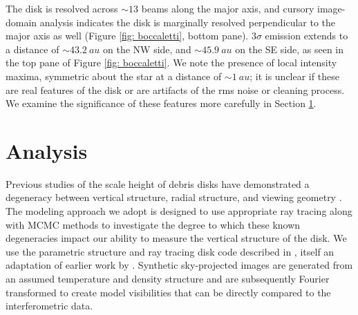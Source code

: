 \documentclass[12pt,oneside]{article}
\begin{document}
The disk is resolved across $\sim13$ beams along the major axis, and cursory image-domain analysis indicates the disk is marginally resolved perpendicular to the major axis as well (Figure \ref{fig: boccaletti}, bottom pane).
$3\sigma$ emission extends to a distance of $\sim \SI{43.2}{au}$ on the NW side, and $\sim \SI{45.9}{au}$ on the SE side, as seen in the top pane of Figure \ref{fig: boccaletti}. 
We note the presence of local intensity maxima, symmetric about the star at a distance of $\sim \SI{1}{au}$; it is unclear if these are real features of the disk or are artifacts of the rms noise or cleaning process. 
We examine the significance of these features more carefully in Section \ref{section: analysis}.


\section{Analysis}
\label{section: analysis}
Previous studies of the scale height of debris disks have demonstrated a degeneracy between vertical structure, radial structure, and viewing geometry \citep[e.g.,][]{milli14}.  
The modeling approach we adopt is designed to use appropriate ray tracing along with MCMC methods to investigate the degree to which these known degeneracies impact our ability to measure the vertical structure of the disk.  
We use the parametric structure and ray tracing disk code described in \cite{flaherty15}, itself an adaptation of earlier work by \cite{rosenfeld13}.
Synthetic sky-projected images are generated from an assumed temperature and density structure and are subsequently Fourier transformed to create model visibilities that can be directly compared to the interferometric data.
\end{document}
